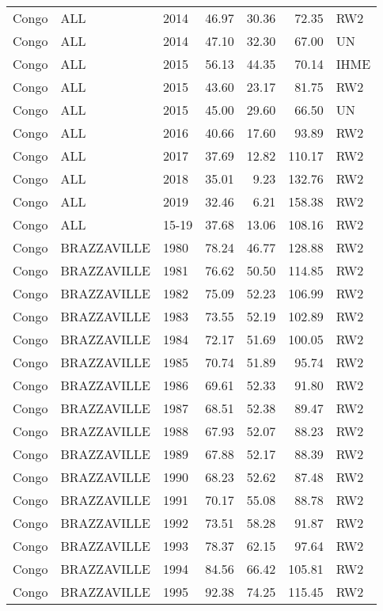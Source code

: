\begin{longtable}{lllrrrl}
  Congo & ALL & 2014 & 46.97 & 30.36 & 72.35 & RW2 \\ 
  Congo & ALL & 2014 & 47.10 & 32.30 & 67.00 & UN \\ 
  Congo & ALL & 2015 & 56.13 & 44.35 & 70.14 & IHME \\ 
  Congo & ALL & 2015 & 43.60 & 23.17 & 81.75 & RW2 \\ 
  Congo & ALL & 2015 & 45.00 & 29.60 & 66.50 & UN \\ 
  Congo & ALL & 2016 & 40.66 & 17.60 & 93.89 & RW2 \\ 
  Congo & ALL & 2017 & 37.69 & 12.82 & 110.17 & RW2 \\ 
  Congo & ALL & 2018 & 35.01 & 9.23 & 132.76 & RW2 \\ 
  Congo & ALL & 2019 & 32.46 & 6.21 & 158.38 & RW2 \\ 
  Congo & ALL & 15-19 & 37.68 & 13.06 & 108.16 & RW2 \\ 
  Congo & BRAZZAVILLE & 1980 & 78.24 & 46.77 & 128.88 & RW2 \\ 
  Congo & BRAZZAVILLE & 1981 & 76.62 & 50.50 & 114.85 & RW2 \\ 
  Congo & BRAZZAVILLE & 1982 & 75.09 & 52.23 & 106.99 & RW2 \\ 
  Congo & BRAZZAVILLE & 1983 & 73.55 & 52.19 & 102.89 & RW2 \\ 
  Congo & BRAZZAVILLE & 1984 & 72.17 & 51.69 & 100.05 & RW2 \\ 
  Congo & BRAZZAVILLE & 1985 & 70.74 & 51.89 & 95.74 & RW2 \\ 
  Congo & BRAZZAVILLE & 1986 & 69.61 & 52.33 & 91.80 & RW2 \\ 
  Congo & BRAZZAVILLE & 1987 & 68.51 & 52.38 & 89.47 & RW2 \\ 
  Congo & BRAZZAVILLE & 1988 & 67.93 & 52.07 & 88.23 & RW2 \\ 
  Congo & BRAZZAVILLE & 1989 & 67.88 & 52.17 & 88.39 & RW2 \\ 
  Congo & BRAZZAVILLE & 1990 & 68.23 & 52.62 & 87.48 & RW2 \\ 
  Congo & BRAZZAVILLE & 1991 & 70.17 & 55.08 & 88.78 & RW2 \\ 
  Congo & BRAZZAVILLE & 1992 & 73.51 & 58.28 & 91.87 & RW2 \\ 
  Congo & BRAZZAVILLE & 1993 & 78.37 & 62.15 & 97.64 & RW2 \\ 
  Congo & BRAZZAVILLE & 1994 & 84.56 & 66.42 & 105.81 & RW2 \\ 
  Congo & BRAZZAVILLE & 1995 & 92.38 & 74.25 & 115.45 & RW2 \\ 

\end{longtable}
